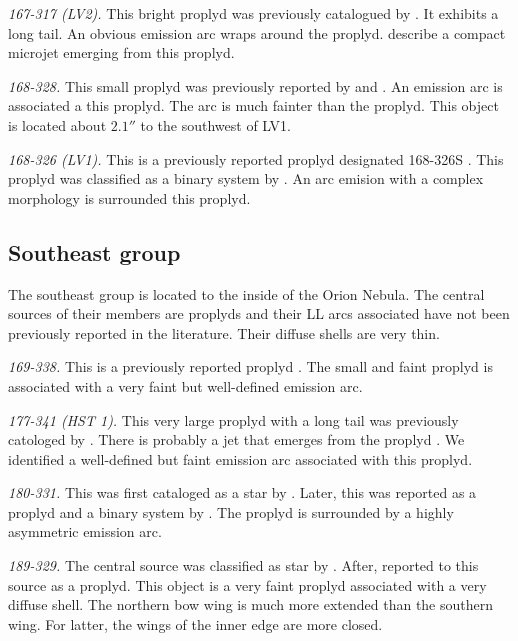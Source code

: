 \documentclass[iop, apj]{emulateapj}
\begin{document}
\textit{167-317 (LV2).} This bright proplyd was previously catalogued by \citet{ODell:1994a, Ricci:2008a}. It exhibits a long tail. An obvious emission arc \citep{Bally:2000a} wraps around the proplyd. \citet{Bally:2000a} describe a compact microjet emerging from this proplyd. 

\textit{168-328.} This small proplyd was previously reported by \citet{ODell:1994a} and \citet{Ricci:2008a}. An emission arc is associated a this proplyd. The arc is much fainter than the proplyd. This object is located about \(2.1''\) to the southwest of LV1.  

\textit{168-326 (LV1).} This is a previously reported proplyd  designated 168-326S \citep{ODell:1994a}. This proplyd was classified as a binary system by \citet{Ricci:2008a}. An arc emision with a complex morphology is surrounded this proplyd.


\clearpage
\subsection{Southeast group}
\label{sec:se-group}



The southeast group is located to the inside of the Orion Nebula. The central sources of their members are proplyds and their LL arcs associated have not been previously reported in the literature. Their diffuse shells are very thin. 

\textit{169-338.} This is a previously reported proplyd \citep{ODell:1994a, Ricci:2008a}. The small and faint proplyd is associated with a very faint but well-defined emission arc. 

\textit{177-341 (HST 1).} This very large proplyd with a long tail was
previously catologed by \citet{ODell:1994a, Ricci:2008a}. There is probably a jet that emerges from the proplyd \citep{Bally:2000a}. We identified a well-defined but faint  emission arc associated with this proplyd.

\textit{180-331.} This was first cataloged as a star by \citet{ODell:1996a}. Later, this was reported as a proplyd and a binary system by \citet{Ricci:2008a}. The proplyd is surrounded by a highly asymmetric emission arc.

\textit{189-329.} The central source was classified as star by \citet{ODell:1996a}. After, \citet{Ricci:2008a} reported to this source as a proplyd. This object is a very faint proplyd associated with a very diffuse shell. The northern bow wing is much more extended than the southern wing. For latter, the wings of the inner edge are more closed. 
\end{document}

